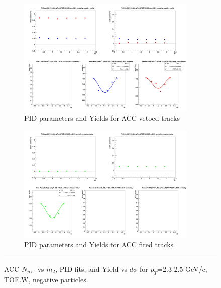 \begin{figure}[H]
  \ContinuedFloat
    \begin{subfigure}{1\textwidth}
   \centering
   \includegraphics[width=0.94\textwidth]{hiptfits/neg/fitParams_tof2_cent0_ch0_pT-23-25.jpg}
    \caption{PID parameters and Yields for ACC vetoed tracks}
    \end{subfigure}    
    \begin{subfigure}{1\textwidth}
   \centering
   \includegraphics[width=0.94\textwidth]{hiptfits/neg/fitParams_tof3_cent0_ch0_pT-23-25.jpg}
    \caption{PID parameters and Yields for ACC fired tracks}
    \end{subfigure} 
    \rule{35em}{0.5pt}
  \caption[ACC $N_{p.e.}$ vs $m_2$, PID fits, and Yield vs $d\phi$ for $p_T$=2.3-2.5 GeV/c, TOF.W, negative particles.]{ACC $N_{p.e.}$ vs $m_2$, PID fits, and Yield vs $d\phi$ for $p_T$=2.3-2.5 GeV/c, TOF.W, negative particles.}
  \label{fig:acc23-25neg}
\end{figure}


